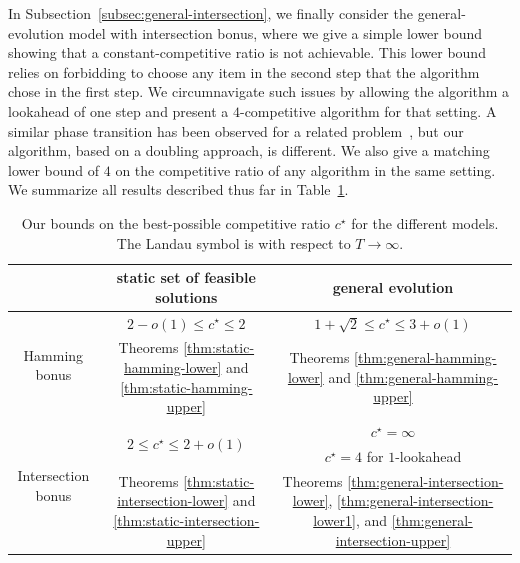 \documentclass[a4paper]{book}
\newcommand{\finalversion}[1]{#1}
\begin{document}
In Subsection~\ref{subsec:general-intersection}, we finally consider the general-evolution model with intersection bonus, where we give a simple lower bound showing that a constant-competitive ratio is not achievable. This lower bound relies on forbidding to choose any item in the second step that the algorithm chose in the first step. We circumnavigate such issues by allowing the algorithm a lookahead of one step and present a $4$-competitive algorithm for that setting. A similar phase transition has been observed for a related problem~\cite{Bampis+}, but our algorithm, based on a doubling approach, is different. We also give a matching lower bound of $4$ on the competitive ratio of any algorithm in the same setting. We summarize all results described thus far in Table~\ref{table:results}.



\begin{table}[t]
	\centering
	\def\arraystretch{1.1}
	\begin{tabular}{ccc}
		\toprule
		&static set of feasible solutions&general evolution\\
		\midrule
		\multirow{2}{*}{Hamming bonus}& \finalversion{$2-o(1)\leq c^\star\leq2$} & $1+\sqrt{2}\leq c^\star\leq3+o(1)$ \\
		&  Theorems \ref{thm:static-hamming-lower} and \ref{thm:static-hamming-upper} & Theorems \ref{thm:general-hamming-lower} and \ref{thm:general-hamming-upper}\\[1ex]  
		\midrule
		\multirow{3}{*}{Intersection bonus}& \multirow{2}{*}{$2\leq c^\star\leq 2+o(1)$} & $c^\star=\infty$\\
		& & $c^\star=4$ for $1$-lookahead\\		
		&  Theorems \ref{thm:static-intersection-lower} and \ref{thm:static-intersection-upper} & Theorems \ref{thm:general-intersection-lower}, \ref{thm:general-intersection-lower1}, and \ref{thm:general-intersection-upper} \\[1ex]  
		\bottomrule
	\end{tabular}
	\medskip
	\caption{Our bounds on the best-possible competitive ratio $c^\star$ for the different models. The Landau symbol is with respect to $T\rightarrow\infty$.}
	\label{table:results}
\end{table}
\end{document}
